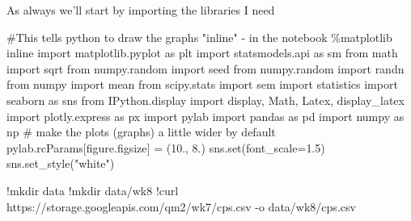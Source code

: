 \documentclass[
  letterpaper,
  DIV=11,
  numbers=noendperiod]{scrreprt}
\newenvironment{Shaded}{\begin{snugshade}}{\end{snugshade}}
\newcommand{\BuiltInTok}[1]{\textcolor[rgb]{0.00,0.23,0.31}{#1}}
\newcommand{\CommentTok}[1]{\textcolor[rgb]{0.37,0.37,0.37}{#1}}
\newcommand{\FloatTok}[1]{\textcolor[rgb]{0.68,0.00,0.00}{#1}}
\newcommand{\ImportTok}[1]{\textcolor[rgb]{0.00,0.46,0.62}{#1}}
\newcommand{\NormalTok}[1]{\textcolor[rgb]{0.00,0.23,0.31}{#1}}
\newcommand{\OperatorTok}[1]{\textcolor[rgb]{0.37,0.37,0.37}{#1}}
\newcommand{\StringTok}[1]{\textcolor[rgb]{0.13,0.47,0.30}{#1}}
\begin{document}
As always we'll start by importing the libraries I need

\begin{Shaded}
\begin{Highlighting}[]
\CommentTok{\#This tells python to draw the graphs "inline" {-} in the notebook}
\OperatorTok{\%}\NormalTok{matplotlib inline  }
\ImportTok{import}\NormalTok{ matplotlib.pyplot }\ImportTok{as}\NormalTok{ plt}
\ImportTok{import}\NormalTok{ statsmodels.api }\ImportTok{as}\NormalTok{ sm}
\ImportTok{from}\NormalTok{ math }\ImportTok{import}\NormalTok{ sqrt}
\ImportTok{from}\NormalTok{ numpy.random }\ImportTok{import}\NormalTok{ seed}
\ImportTok{from}\NormalTok{ numpy.random }\ImportTok{import}\NormalTok{ randn}
\ImportTok{from}\NormalTok{ numpy }\ImportTok{import}\NormalTok{ mean}
\ImportTok{from}\NormalTok{ scipy.stats }\ImportTok{import}\NormalTok{ sem}
\ImportTok{import}\NormalTok{ statistics }
\ImportTok{import}\NormalTok{ seaborn }\ImportTok{as}\NormalTok{ sns}
\ImportTok{from}\NormalTok{ IPython.display }\ImportTok{import}\NormalTok{ display, Math, Latex, display\_latex}
\ImportTok{import}\NormalTok{ plotly.express }\ImportTok{as}\NormalTok{ px}
\ImportTok{import}\NormalTok{ pylab}
\ImportTok{import}\NormalTok{ pandas }\ImportTok{as}\NormalTok{ pd}
\ImportTok{import}\NormalTok{ numpy }\ImportTok{as}\NormalTok{ np}
\CommentTok{\# make the plots (graphs) a little wider by default}
\NormalTok{pylab.rcParams[}\StringTok{\textquotesingle{}figure.figsize\textquotesingle{}}\NormalTok{] }\OperatorTok{=}\NormalTok{ (}\FloatTok{10.}\NormalTok{, }\FloatTok{8.}\NormalTok{)}
\NormalTok{sns.}\BuiltInTok{set}\NormalTok{(font\_scale}\OperatorTok{=}\FloatTok{1.5}\NormalTok{)}
\NormalTok{sns.set\_style(}\StringTok{"white"}\NormalTok{)}

\end{Highlighting}
\end{Shaded}

\begin{Shaded}
\begin{Highlighting}[]
\OperatorTok{!}\NormalTok{mkdir data}
\OperatorTok{!}\NormalTok{mkdir data}\OperatorTok{/}\NormalTok{wk8}
\OperatorTok{!}\NormalTok{curl https:}\OperatorTok{//}\NormalTok{storage.googleapis.com}\OperatorTok{/}\NormalTok{qm2}\OperatorTok{/}\NormalTok{wk7}\OperatorTok{/}\NormalTok{cps.csv }\OperatorTok{{-}}\NormalTok{o data}\OperatorTok{/}\NormalTok{wk8}\OperatorTok{/}\NormalTok{cps.csv}
\end{Highlighting}
\end{Shaded}
\end{document}

